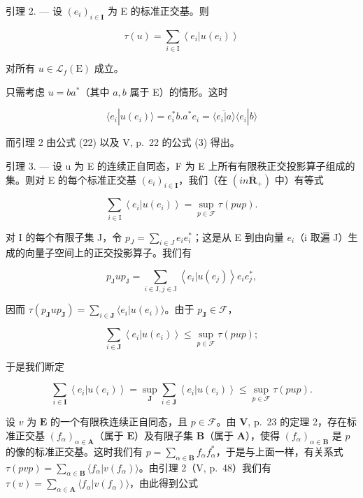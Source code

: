 引理 2. --- 设 \((e_i)_{i\in \mathbf{I}}\) 为 E 的标准正交基。则

\[
\tau (u) = \sum_ {i \in \mathrm{I}} \left\langle e _ {i} | u (e _ {i}) \right\rangle
\]

对所有 \(u \in \mathcal{L}_f(\mathrm{E})\) 成立。

只需考虑 \(u = ba^{*}\)（其中 \(a, b\) 属于 E）的情形。这时

\[
\langle e _ {i} | u (e _ {i}) \rangle = e _ {i} ^ {*} b. a ^ {*} e _ {i} = \overline {{\langle e _ {i} | a \rangle}} \langle e _ {i} | b \rangle
\]

而引理 2 由公式 (22) 以及 V, p.~22 的公式 (3) 得出。

引理 3. --- 设 u 为 E 的连续正自同态，F 为 E 上所有有限秩正交投影算子组成的集。则对 E 的每个标准正交基 \((e_{i})_{i\in\mathbf{I}}\)，我们（在 \((in\overline{\mathbf{R}}_{+})\) 中）有等式

\[
\sum_ {i \in \mathrm{I}} \left\langle e _ {i} | u (e _ {i}) \right\rangle = \sup _ {p \in \mathcal {F}} \tau (p u p).
\]

对 I 的每个有限子集 J，令 \(p_{J} = \sum_{i \in J} e_{i} e_{i}^{*}\)；这是从 E 到由向量 \(e_{i}\)（i 取遍 J）生成的向量子空间上的正交投影算子。我们有

\[
p _ {\mathrm{J}} u p _ {\mathrm{J}} = \sum_ {i \in \mathrm{J}, j \in \mathrm{J}} \left\langle e _ {i} | u (e _ {j}) \right\rangle e _ {i} e _ {j} ^ {*},
\]

因而 \(\tau(p_{\mathbf{J}}up_{\mathbf{J}}) = \sum_{i\in \mathbf{J}}\langle e_i|u(e_i)\rangle\)。由于 \(p_{\mathbf{J}}\in \mathcal{F}\)，

\[
\sum_ {i \in \mathbf {J}} \left\langle e _ {i} | u (e _ {i}) \right\rangle \leqslant \sup _ {p \in \mathcal {F}} \tau (p u p);
\]

于是我们断定

\[
\sum_ {i \in \mathbf {I}} \left\langle e _ {i} | u (e _ {i}) \right\rangle = \sup _ {\mathbf {J}} \sum_ {i \in \mathbf {J}} \left\langle e _ {i} | u (e _ {i}) \right\rangle \leqslant \sup _ {p \in \mathcal {F}} \tau (p u p).
\]

设 \(v\) 为 \(\mathbf{E}\) 的一个有限秩连续正自同态，且 \(p \in \mathcal{F}\)。由 \(\mathbf{V}\), p.~23 的定理 2，存在标准正交基 \((f_{\alpha})_{\alpha \in \mathbf{A}}\)（属于 \(\mathbf{E}\)）及有限子集 \(\mathbf{B}\)（属于 \(\mathbf{A}\)），使得 \((f_{\alpha})_{\alpha \in \mathbf{B}}\) 是 \(p\) 的像的标准正交基。这时我们有 \(p = \sum_{\alpha \in \mathbf{B}} f_{\alpha} f_{\alpha}^{*}\)，于是与上面一样，有关系式 \(\tau(pvp) = \sum_{\alpha \in \mathbf{B}} \langle f_{\alpha}|v(f_{\alpha}) \rangle\)。由引理 2（V, p.~48）我们有 \(\tau(v) = \sum_{\alpha \in \mathbf{A}} \langle f_{\alpha}|v(f_{\alpha}) \rangle\)，由此得到公式

